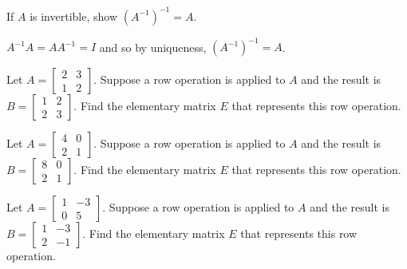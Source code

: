 \documentclass{ximera}
\begin{document}
\begin{problem}\label{prb:4.53}If $A$ is invertible, show $\left( A^{-1}\right) ^{-1}=A.$

\begin{hint}
 $A^{-1}A=AA^{-1}=I$ and so by
uniqueness, $\left( A^{-1}\right) ^{-1}=A$.
\end{hint}
\end{problem}

\begin{problem}\label{prb:4.54}
Let $A = \left[ \begin{array}{rr}
2 & 3 \\
1 & 2
\end{array}\right]$. Suppose a row operation is applied to $A$ and the result is $B = \left[ \begin{array}{rr}
1 & 2 \\
2 & 3
\end{array}\right]$. Find the elementary matrix $E$ that represents this row operation.
\end{problem}

\begin{problem}\label{prb:4.55}
Let $A = \left[ \begin{array}{rr}
4 & 0 \\
2 & 1
\end{array}\right]$. Suppose a row operation is applied to $A$ and the result is $B = \left[ \begin{array}{rr}
8 & 0 \\
2 & 1
\end{array}\right]$. Find the elementary matrix $E$ that represents this row operation.
\end{problem}

\begin{problem}\label{prb:4.56}
Let $A = \left[ \begin{array}{rr}
1 & -3 \\
0 & 5
\end{array}\right]$. Suppose a row operation is applied to $A$ and the result is $B = \left[ \begin{array}{rr}
1 & -3 \\
2 & -1
\end{array}\right]$. Find the elementary matrix $E$ that represents this row operation.
\end{problem}
\end{document}
